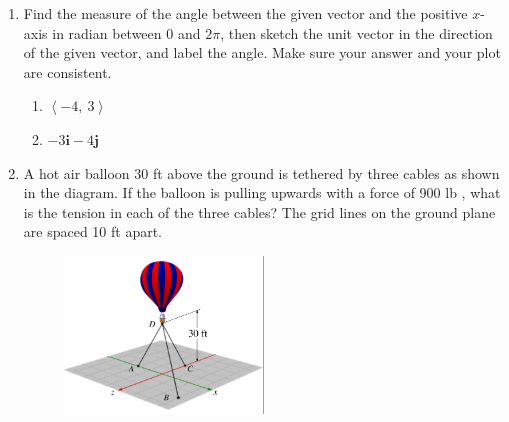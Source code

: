 \documentclass[10pt]{article}
\title{}
\date{}
\newcommand{\inpr}[1]{\left\langle#1\right\rangle}
\begin{document}
\begin{enumerate}
\item
Find the measure of the angle between the given vector and the positive $x$-axis in radian between $0$ and $2\pi$, then sketch the unit vector in the direction of the given vector, and label the angle. Make sure your answer and your plot are consistent.
\begin{enumerate}
\item $\inpr{-4,\ 3}$
\item $-3\mathbf i - 4\mathbf j$ 
\end{enumerate}
\clearpage
\item A hot air balloon 30 ft above the ground is tethered by three cables as shown in the diagram. If the balloon is pulling upwards with a force of 900 lb ,
what is the tension in each of the three cables? The grid lines on the ground plane are spaced 10 ft apart.
\begin{figure}[h]
\includegraphics[width = 0.5\textwidth, right]{ballon.png}
\end{figure}
\end{enumerate}
\end{document}
